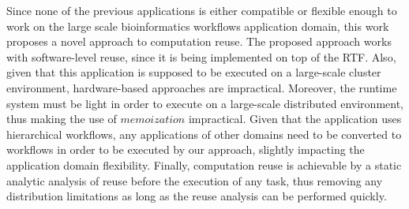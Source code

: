 Since none of the previous applications is either compatible or flexible enough to work on the large scale bioinformatics workflows application domain, this work proposes a novel approach to computation reuse. The proposed approach works with software-level reuse, since it is being implemented on top of the RTF. Also, given that this application is supposed to be executed on a large-scale cluster environment, hardware-based approaches are impractical. Moreover, the runtime system must be light in order to execute on a large-scale distributed environment, thus making the use of $memoization$ impractical. Given that the application uses hierarchical workflows, any applications of other domains need to be converted to workflows in order to be executed by our approach, slightly impacting the application domain flexibility. Finally, computation reuse is achievable by a static analytic analysis of reuse before the execution of any task, thus removing any distribution limitations as long as the reuse analysis can be performed quickly.





